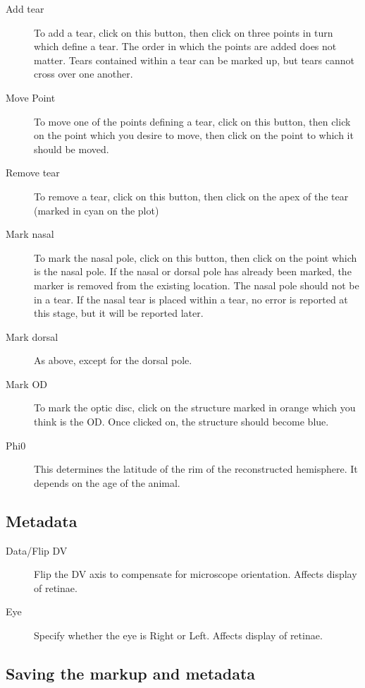 \documentclass{article}
\begin{document}
\begin{description}
\item[Add tear] To add a tear, click on this button, then click on
  three points in turn which define a tear. The order in which the
  points are added does not matter. Tears contained within a tear can
  be marked up, but tears cannot cross over one another.
\item[Move Point] To move one of the points defining a tear, click on
  this button, then click on the point which you desire to move, then
  click on the point to which it should be moved.
\item[Remove tear] To remove a tear, click on this button, then click
  on the apex of the tear (marked in cyan on the plot)
\item[Mark nasal] To mark the nasal pole, click on this button, then
  click on the point which is the nasal pole.  If the nasal or
  dorsal pole has already been marked, the marker is removed from
  the existing location. The nasal pole should not be in a tear. If
  the nasal tear is placed within a tear, no error is reported at this
  stage, but it will be reported later.
\item[Mark dorsal] As above, except for the dorsal pole.
\item[Mark OD] To mark the optic disc, click on the structure marked
  in orange which you think is the OD. Once clicked on, the structure
  should become blue.
\item[Phi0] This determines the latitude of the rim of the
  reconstructed hemisphere. It depends on the age of the animal.
\end{description}

\subsection{Metadata}
\label{retistruct-manual:sec:metadata}

\begin{description}
\item[Data/Flip DV] Flip the DV axis to compensate for microscope
  orientation. Affects display of retinae.
\item[Eye] Specify whether the eye is Right or Left.  Affects display
  of retinae.
\end{description}

\subsection{Saving the markup and metadata}
\label{manual:sec:saving-markup}
\end{document}
